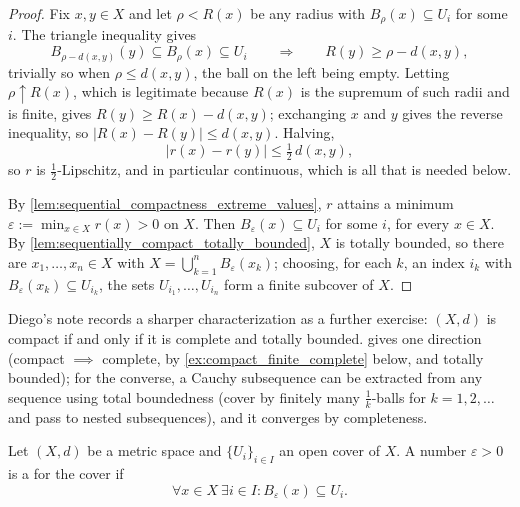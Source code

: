 \begin{proof}
Fix $x,y \in X$ and let $\rho < R(x)$ be any radius with $B_\rho(x) \subseteq U_i$ for some $i$.
The triangle inequality gives
\[B_{\rho-d(x,y)}(y) \subseteq B_{\rho}(x) \subseteq U_i
\qquad\Longrightarrow\qquad R(y) \geq \rho-d(x,y),\]
trivially so when $\rho \leq d(x,y)$, the ball on the left being empty. Letting
$\rho \uparrow R(x)$, which is legitimate because $R(x)$ is the supremum of such radii and is
finite, gives $R(y) \geq R(x)-d(x,y)$; exchanging $x$ and $y$ gives the reverse inequality, so
$\lvert R(x)-R(y)\rvert \leq d(x,y)$. Halving,
\[|r(x)-r(y)| \leq \tfrac12\,d(x,y),\]
so $r$ is $\tfrac12$-Lipschitz, and in particular continuous, which is all that is needed below.

By \cref{lem:sequential_compactness_extreme_values}, $r$ attains a minimum
$\varepsilon := \min_{x\in X} r(x) > 0$ on $X$. Then $B_\varepsilon(x) \subseteq U_i$ for some $i$,
for every $x \in X$. By \cref{lem:sequentially_compact_totally_bounded}, $X$ is totally bounded,
so there are $x_1,\dots,x_n \in X$ with $X = \bigcup_{k=1}^n B_\varepsilon(x_k)$; choosing, for
each $k$, an index $i_k$ with $B_\varepsilon(x_k) \subseteq U_{i_k}$, the sets
$U_{i_1},\dots,U_{i_n}$ form a finite subcover of $X$.
\end{proof}

\begin{remark}
\label{rem:compact_iff_complete_totally_bounded}
Diego's note records a sharper characterization as a further exercise: $(X,d)$ is compact if and
only if it is complete and totally bounded.  gives
one direction (compact $\implies$ complete, by \cref{ex:compact_finite_complete} below, and
totally bounded); for the converse, a Cauchy subsequence can be extracted from any sequence using
total boundedness (cover by finitely many $\tfrac1k$-balls for $k=1,2,\dots$ and pass to nested
subsequences), and it converges by completeness.
\end{remark}

\begin{definition}
\label{def:lebesgue_number}
Let $(X,d)$ be a metric space and $\{U_i\}_{i\in I}$ an open cover of $X$. A number
$\varepsilon > 0$ is a   for the cover if
\[\forall x \in X\ \exists i \in I: B_\varepsilon(x) \subseteq U_i.\]
\end{definition}

